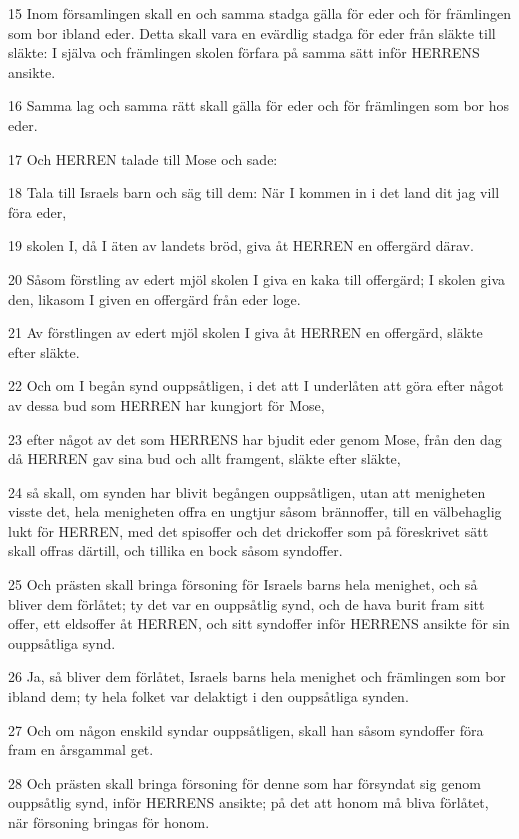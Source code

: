 \par 15 Inom församlingen skall en och samma stadga gälla för eder och för främlingen som bor ibland eder. Detta skall vara en evärdlig stadga för eder från släkte till släkte: I själva och främlingen skolen förfara på samma sätt inför HERRENS ansikte.
\par 16 Samma lag och samma rätt skall gälla för eder och för främlingen som bor hos eder.
\par 17 Och HERREN talade till Mose och sade:
\par 18 Tala till Israels barn och säg till dem: När I kommen in i det land dit jag vill föra eder,
\par 19 skolen I, då I äten av landets bröd, giva åt HERREN en offergärd därav.
\par 20 Såsom förstling av edert mjöl skolen I giva en kaka till offergärd; I skolen giva den, likasom I given en offergärd från eder loge.
\par 21 Av förstlingen av edert mjöl skolen I giva åt HERREN en offergärd, släkte efter släkte.
\par 22 Och om I begån synd ouppsåtligen, i det att I underlåten att göra efter något av dessa bud som HERREN har kungjort för Mose,
\par 23 efter något av det som HERRENS har bjudit eder genom Mose, från den dag då HERREN gav sina bud och allt framgent, släkte efter släkte,
\par 24 så skall, om synden har blivit begången ouppsåtligen, utan att menigheten visste det, hela menigheten offra en ungtjur såsom brännoffer, till en välbehaglig lukt för HERREN, med det spisoffer och det drickoffer som på föreskrivet sätt skall offras därtill, och tillika en bock såsom syndoffer.
\par 25 Och prästen skall bringa försoning för Israels barns hela menighet, och så bliver dem förlåtet; ty det var en ouppsåtlig synd, och de hava burit fram sitt offer, ett eldsoffer åt HERREN, och sitt syndoffer inför HERRENS ansikte för sin ouppsåtliga synd.
\par 26 Ja, så bliver dem förlåtet, Israels barns hela menighet och främlingen som bor ibland dem; ty hela folket var delaktigt i den ouppsåtliga synden.
\par 27 Och om någon enskild syndar ouppsåtligen, skall han såsom syndoffer föra fram en årsgammal get.
\par 28 Och prästen skall bringa försoning för denne som har försyndat sig genom ouppsåtlig synd, inför HERRENS ansikte; på det att honom må bliva förlåtet, när försoning bringas för honom.
